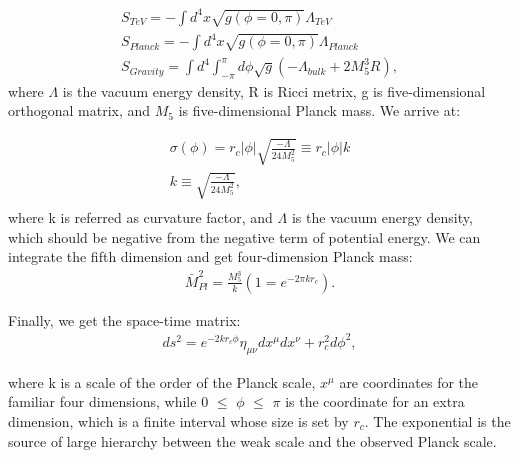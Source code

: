 \begin{equation} 
\begin{split}
S_{TeV}=-\int d^4x \sqrt{g(\phi =0,\pi)}\Lambda_{TeV}\\
S_{Planck}=-\int d^4x \sqrt{g(\phi =0,\pi)}\Lambda_{Planck}\\
S_{Gravity}=\int d^4 \int ^{\pi}_{-\pi} d\phi \sqrt{g}(-\Lambda_{bulk}+2M^3_{5}R),
\end{split}
\end{equation}
where $\Lambda$ is the vacuum energy density, R is Ricci metrix, g is five-dimensional orthogonal matrix, and $M_5$ is five-dimensional Planck mass. We arrive at:

\begin{equation} 
\begin{split}
\sigma(\phi)=r_{c}|\phi | \sqrt{\frac{-\Lambda}{24M^2_5}}\equiv r_c|\phi |k \\
k\equiv  \sqrt{\frac{-\Lambda}{24M^2_5}}, \\
\end{split}
\end{equation}
where k is referred as curvature factor, and $\Lambda$ is the vacuum energy density, which should be negative from the negative term of potential energy. We can integrate the fifth dimension and get four-dimension Planck mass: 
\begin{equation} 
\begin{split}
\bar{M}^2_{Pl}=\frac{M^3_5}{k}(1=e^{-2\pi kr_c}).
\end{split}
\end{equation}

Finally, we get the space-time matrix:  
\begin{equation} 
\begin{split}
ds^2 = e^{-2kr_c\phi}\eta_{\mu\nu}dx^{\mu}dx^{\nu} + r^2_{c}d\phi^2, 
\end{split}
\end{equation}


where k is a scale of the order of the Planck scale, $x^{\mu}$ are
coordinates for the familiar four dimensions, while 0 $\leq$ $\phi$ $\leq$ $\pi$ is the coordinate for an extra dimension, which is
a finite interval whose size is set by $r_c$. The exponential is the source of large hierarchy between the weak scale and the observed Planck scale.  



